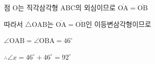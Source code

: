 점 $\mathrm{O}$는 직각삼각형 $\mathrm{ABC}$의 외심이므로 $\overline{\mathrm{OA}} = \overline{\mathrm{OB}}$

따라서 $\triangle\mathrm{OAB}$는 $\overline{\mathrm{OA}} = \overline{\mathrm{OB}}$인 이등변삼각형이므로

$\angle\mathrm{OAB} = \angle\mathrm{OBA} = 46^\circ$

$\therefore \angle x = 46^\circ + 46^\circ = 92^\circ$
